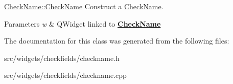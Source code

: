 \hyperlink{classCheckName_a4a7fe601d6fd5e8576498e2d953df614}{Check\+Name\+::\+Check\+Name} Construct a \hyperlink{classCheckName}{Check\+Name}. 


\begin{DoxyParams}{Parameters}
{\em w} & Q\+Widget linked to {\bfseries \hyperlink{classCheckName}{Check\+Name}} \\
\hline
\end{DoxyParams}


The documentation for this class was generated from the following files\+:\begin{DoxyCompactItemize}
\item 
src/widgets/checkfields/checkname.\+h\item 
src/widgets/checkfields/checkname.\+cpp\end{DoxyCompactItemize}
